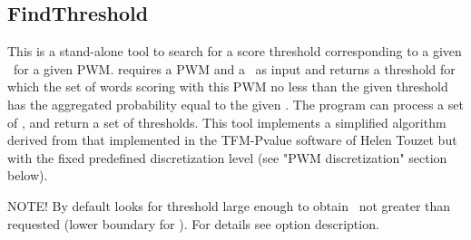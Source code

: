\subsection{FindThreshold}
This is a stand-alone tool to search for a score threshold corresponding to a given \pvalue\ for a given PWM.
 requires a PWM and a \pvalue\ as input and returns a threshold for which the set of
words scoring with this PWM no less than the given threshold has the aggregated probability equal to
the given \pvalue. The program can process a set of \pvalues, and return a set of thresholds.
This tool implements a simplified algorithm derived from that implemented in the TFM-Pvalue software of
Helen Touzet  but with the fixed predefined discretization level (see "PWM
discretization" section below).

\usageheader
{}


NOTE! By default  looks for threshold large enough to obtain \pvalue\ not 
greater than requested (lower boundary for \pvalue). For details see  option description.
